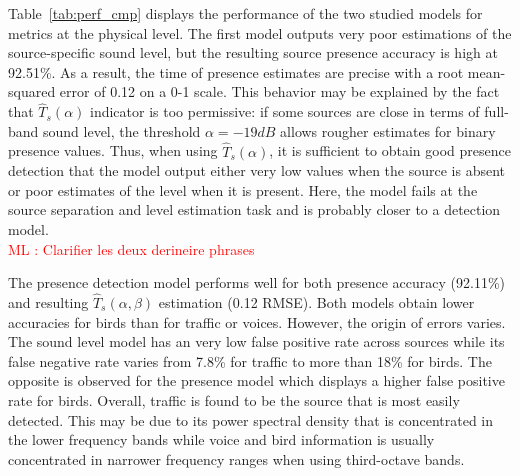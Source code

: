 \documentclass[11pt,a4paper]{article}
\newcommand{\ml}[1]{\textcolor{red}{ML : #1}}
\begin{document}
Table~\ref{tab:perf_cmp} displays the performance of the two studied models for metrics at the physical level. The first model outputs very poor estimations of the source-specific sound level, but the resulting source presence accuracy is high at 92.51\%. As a result, the time of presence estimates are precise with a root mean-squared error of 0.12 on a 0-1 scale. This behavior may be explained by the fact that $\hat T_s(\alpha)$ indicator is too permissive: if some sources are close in terms of full-band sound level, the threshold $\alpha = -19dB$ allows rougher estimates for binary presence values. Thus, when using $\hat T_s(\alpha)$, it is sufficient to obtain good presence detection that the model output either very low values when the source is absent or poor estimates of the level when it is present. Here, the model fails at the source separation and level estimation task and is probably closer to a detection model.\\ \ml{Clarifier les deux derineire phrases}

The presence detection model performs well for both presence accuracy (92.11\%) and resulting $\hat T_s(\alpha, \beta)$ estimation (0.12 RMSE). Both models obtain lower accuracies for birds than for traffic or voices. However, the origin of errors varies. The sound level model has an very low false positive rate across sources while its false negative rate varies from 7.8\% for traffic to more than 18\% for birds. The opposite is observed for the presence model which displays a higher false positive rate for birds. Overall, traffic is found to be the source that is most easily detected. This may be due to its power spectral density that is concentrated in the lower frequency bands while voice and bird information is usually concentrated in narrower frequency ranges when using third-octave bands.\\
\end{document}
